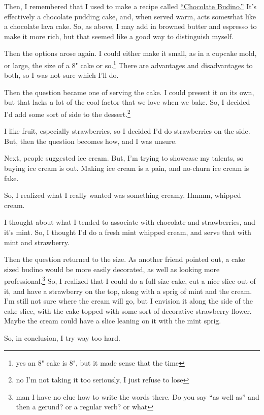 \documentclass[12pt]{article}[titlepage]
\newcommand{\say}[1]{``#1''}
\newcommand{\1}{\={a}}
\newcommand{\2}{\={e}}
\newcommand{\3}{\={\i}}
\newcommand{\4}{\=o}
\newcommand{\5}{\=u}
\newcommand{\6}{\={A}}
\renewcommand{\,}{\textsuperscript{,}}
\begin{document}
Then, I remembered that I used to make a recipe called \href{http://catcora.com/recipes/desserts/chocolate-budino/}{\say{Chocolate Budino.}}
It's effectively a chocolate pudding cake, and, when served warm, acts somewhat like a chocolate lava cake.
So, as above, I may add in browned butter and espresso to make it more rich, but that seemed like a good way to distinguish myself.

Then the options arose again.
I could either make it small, as in a cupcake mold, or large, the size of a 8" cake or so.\footnote{yes an 8" cake is 8", but it made sense that the time}
There are advantages and disadvantages to both, so I was not sure which I'll do.

Then the question became one of serving the cake.
I could present it on its own, but that lacks a lot of the cool factor that we love when we bake.
So, I decided I'd add some sort of side to the dessert.\footnote{no I'm not taking it too seriously, I just refuse to lose}

I like fruit, especially strawberries, so I decided I'd do strawberries on the side.
But, then the question becomes how, and I was unsure.

Next, people suggested ice cream.
But, I'm trying to showcase my talents, so buying ice cream is out.
Making ice cream is a pain, and no-churn ice cream is fake.

So, I realized what I really wanted was something creamy.
Hmmm, whipped cream.

I thought about what I tended to associate with chocolate and strawberries, and it's mint.
So, I thought I'd do a fresh mint whipped cream, and serve that with mint and strawberry.

Then the question returned to the size.
As another friend pointed out, a cake sized budino would be more easily decorated, as well as looking more professional.\footnote{man I have no clue how to write the words there. Do you say \say{as well as} and then a gerund? or a regular verb? or what}
So, I realized that I could do a full size cake, cut a nice slice out of it, and have a strawberry on the top, along with a sprig of mint and the cream.
I'm still not sure where the cream will go, but I envision it along the side of the cake slice, with the cake topped with some sort of decorative strawberry flower.
Maybe the cream could have a slice leaning on it with the mint sprig.

So, in conclusion, I try way too hard. 
\end{document}
